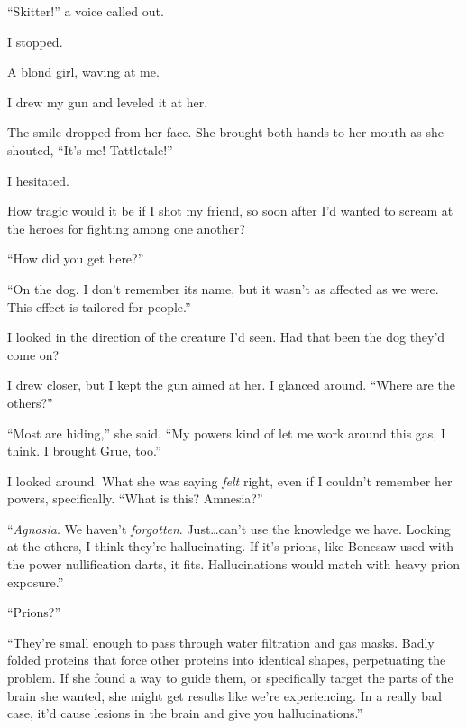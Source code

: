 ``Skitter!'' a voice called out.



I stopped.



A blond girl, waving at me.



I drew my gun and leveled it at her.



The smile dropped from her face.  She brought both hands to her mouth as she shouted, ``It's me!  Tattletale!''



I hesitated.



How tragic would it be if I shot my friend, so soon after I'd wanted to scream at the heroes for fighting among one another?



``How did you get here?''



``On the dog.  I don't remember its name, but it wasn't as affected as we were.  This effect is tailored for people.''



I looked in the direction of the creature I'd seen.  Had that been the dog they'd come on?



I drew closer, but I kept the gun aimed at her.  I glanced around.  ``Where are the others?''



``Most are hiding,'' she said.  ``My powers kind of let me work around this gas, I think.  I brought Grue, too.''



I looked around.  What she was saying \emph{felt} right, even if I couldn't remember her powers, specifically.  ``What is this?  Amnesia?''



``\emph{Agnosia}.  We haven't \emph{forgotten}.  Just\ldots can't use the knowledge we have.  Looking at the others, I think they're hallucinating.  If it's prions, like Bonesaw used with the power nullification darts, it fits.  Hallucinations would match with heavy prion exposure.''



``Prions?''



``They're small enough to pass through water filtration and gas masks.  Badly folded proteins that force other proteins into identical shapes, perpetuating the problem.  If she found a way to guide them, or specifically target the parts of the brain she wanted, she might get results like we're experiencing.  In a really bad case, it'd cause lesions in the brain and give you hallucinations.''



